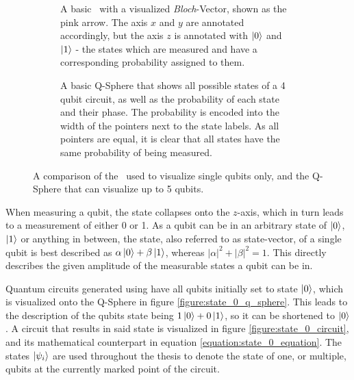 \begin{figure}[!h]
    \centering
    \begin{subfigure}{.4\textwidth}
        \centering
        \scalebox{.6}{
            
        }
        \caption{A basic \bloch\ with a visualized \emph{Bloch}-Vector, shown as the pink arrow. The axis $x$ and $y$ are annotated accordingly, but the axis $z$ is annotated with $\ket{0}$ and $\ket{1}$ - the states which are measured and have a corresponding probability assigned to them.}
        \label{figure:basic_bloch_sphere}
    \end{subfigure}
    \begin{subfigure}{.4\textwidth}
        \centering
        \scalebox{\qspherewidth}{
            
        }
        \caption{A basic Q-Sphere that shows all possible states of a 4 qubit circuit, as well as the probability of each state and their phase. The probability is encoded into the width of the pointers next to the state labels. As all pointers are equal, it is clear that all states have the same probability of being measured.}
        \label{figure:q_sphere_4qubit_h}
    \end{subfigure}
    \caption{A comparison of the \bloch\ used to visualize single qubits only, and the Q-Sphere that can visualize up to 5 qubits.}
    \label{fig:comparison_bloch_sphere_q_sphere}
\end{figure}

\newpage

When measuring a qubit, the state collapses onto the $z$-axis\cite{feynman_feynman_1965}, which in turn leads to a measurement of either 0 or 1. As a qubit can be in an arbitrary state of $\ket{0}$, $\ket{1}$ or anything in between, the state, also referred to as state-vector, of a single qubit is best described as  $\alpha\ket{0}+\beta\ket{1}$, whereas $|\alpha|^2 + |\beta|^2 = 1$\cite{qiskit_representing_nodate}. This directly describes the given amplitude of the measurable states a qubit can be in.\par
Quantum circuits generated using  have all qubits initially set to state $\ket{0}$, which is visualized onto the Q-Sphere in figure \ref{figure:state_0_q_sphere}. This leads to the description of the qubits state being $1\ket{0}+0\ket{1}$, so it can be shortened to $\ket{0}$. A circuit that results in said state is visualized in figure \ref{figure:state_0_circuit}, and its mathematical counterpart in equation \ref{equation:state_0_equation}. The states $\ket{\psi_i}$ are used throughout the thesis to denote the state of one, or multiple, qubits at the currently marked point of the circuit.

